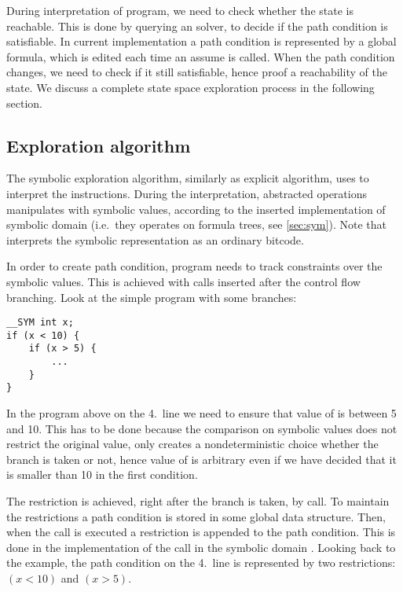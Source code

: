 During interpretation of program, we need to check whether the state is
reachable. This is done by querying an \SMT solver, to decide if the path
condition is satisfiable. In current implementation a path condition is
represented by a global formula, which is edited each time an assume is called.
When the path condition changes, we need to check if it still satisfiable, hence
proof a reachability of the state. We discuss a complete state space
exploration process in the following section.

\subsection{Exploration algorithm}
The symbolic exploration algorithm, similarly as explicit algorithm, uses \DIVM
to interpret the \LLVM instructions. During the interpretation, abstracted
operations manipulates with symbolic values, according to the inserted implementation of
symbolic domain (i.e.~they operates on formula trees, see \autoref{sec:sym}).
Note that \DIVM interprets the symbolic representation as an ordinary \LLVM bitcode.

In order to create path condition, program needs to track constraints over the
symbolic values. This is achieved with  calls inserted after the
control flow branching. Look at the simple program with some branches:
\begin{verbatim}
__SYM int x;
if (x < 10) {
    if (x > 5) {
        ...
    }
}
\end{verbatim}
In the program above on the 4.~line we need to ensure that value of  is
between 5 and 10. This has to be done because the comparison on symbolic values
does not restrict the original value, only creates a nondeterministic choice
whether the branch is taken or not, hence value of  is arbitrary even if
we have decided that it is smaller than 10 in the first condition.

The restriction is achieved, right after the branch is taken, by
 call. To maintain the restrictions a path condition is stored in
some global data structure. Then, when the  call is executed a
restriction is appended to the path condition. This is done in the
implementation of the call  in the symbolic domain
. Looking back to
the example, the path condition on the 4.~line is represented by two
restrictions: $(x < 10)$ and $(x > 5)$.

